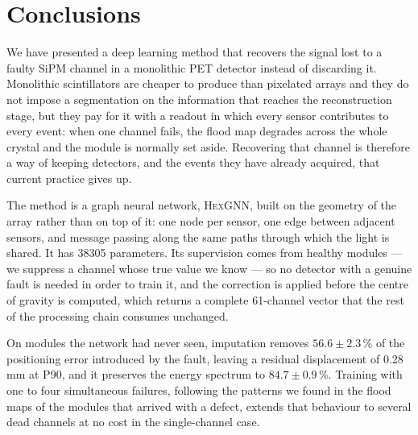 \documentclass[10pt,conference]{IEEEtran}
\begin{document}
\section{Conclusions}
\label{sec:conclusions}

We have presented a deep learning method that recovers the signal lost to a
faulty SiPM channel in a monolithic PET detector instead of discarding it.
Monolithic scintillators are cheaper to produce than pixelated arrays and they
do not impose a segmentation on the information that reaches the reconstruction
stage, but they pay for it with a readout in which every sensor contributes to
every event: when one channel fails, the flood map degrades across the whole
crystal and the module is normally set aside. Recovering that channel is
therefore a way of keeping detectors, and the events they have already
acquired, that current practice gives up.

The method is a graph neural network, \textsc{HexGNN}, built on the geometry of
the array rather than on top of it: one node per sensor, one edge between
adjacent sensors, and message passing along the same paths through which the
light is shared. It has \num{38305} parameters. Its supervision comes from
healthy modules --- we suppress a channel whose true value we know --- so no
detector with a genuine fault is needed in order to train it, and the
correction is applied before the centre of gravity is computed, which returns a
complete 61-channel vector that the rest of the processing chain consumes
unchanged.

On modules the network had never seen, imputation removes $56.6 \pm 2.3$\,\% of
the positioning error introduced by the fault, leaving a residual displacement
of 0.28\,mm at P90, and it preserves the energy spectrum to
$84.7 \pm 0.9$\,\%. Training with one to four simultaneous failures, following
the patterns we found in the flood maps of the modules that arrived with a
defect, extends that behaviour to several dead channels at no cost in the
single-channel case.
\end{document}
